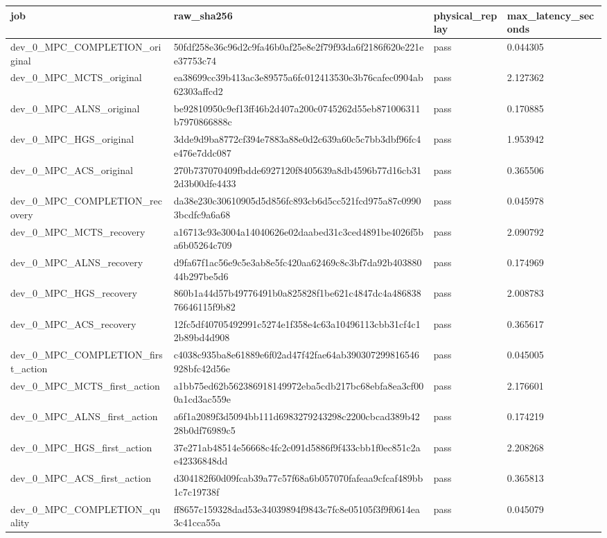 \begin{tabular}{llll}
\hline
job & raw\_sha256 & physical\_replay & max\_latency\_seconds \\
\hline
dev\_0\_MPC\_COMPLETION\_original & 50fdf258e36c96d2c9fa46b0af25e8e2f79f93da6f2186f620e221ee37753c74 & pass & 0.044305 \\
dev\_0\_MPC\_MCTS\_original & ea38699cc39b413ac3e89575a6fc012413530e3b76cafec0904ab62303affcd2 & pass & 2.127362 \\
dev\_0\_MPC\_ALNS\_original & be92810950c9ef13ff46b2d407a200c0745262d55eb871006311b7970866888c & pass & 0.170885 \\
dev\_0\_MPC\_HGS\_original & 3dde9d9ba8772cf394e7883a88e0d2c639a60c5c7bb3dbf96fc4e476e7ddc087 & pass & 1.953942 \\
dev\_0\_MPC\_ACS\_original & 270b737070409fbdde6927120f8405639a8db4596b77d16cb312d3b00dfe4433 & pass & 0.365506 \\
dev\_0\_MPC\_COMPLETION\_recovery & da38e230c30610905d5d856fc893cb6d5cc521fcd975a87c09903bcdfc9a6a68 & pass & 0.045978 \\
dev\_0\_MPC\_MCTS\_recovery & a16713c93e3004a14040626e02daabed31c3ced4891be4026f5ba6b05264c709 & pass & 2.090792 \\
dev\_0\_MPC\_ALNS\_recovery & d9fa67f1ac56e9c5e3ab8e5fc420aa62469c8c3bf7da92b40388044b297be5d6 & pass & 0.174969 \\
dev\_0\_MPC\_HGS\_recovery & 860b1a44d57b49776491b0a825828f1be621c4847dc4a48683876646115f9b82 & pass & 2.008783 \\
dev\_0\_MPC\_ACS\_recovery & 12fc5df40705492991c5274e1f358e4c63a10496113cbb31cf4c12b89bd4d908 & pass & 0.365617 \\
dev\_0\_MPC\_COMPLETION\_first\_action & c4038c935ba8e61889e6f02ad47f42fae64ab390307299816546928bfc42d56e & pass & 0.045005 \\
dev\_0\_MPC\_MCTS\_first\_action & a1bb75ed62b562386918149972eba5cdb217bc68ebfa8ea3cf000a1cd3ac559e & pass & 2.176601 \\
dev\_0\_MPC\_ALNS\_first\_action & a6f1a2089f3d5094bb111d6983279243298c2200cbcad389b4228b0df76989c5 & pass & 0.174219 \\
dev\_0\_MPC\_HGS\_first\_action & 37e271ab48514e56668c4fc2c091d5886f9f433cbb1f0ec851c2ae42336848dd & pass & 2.208268 \\
dev\_0\_MPC\_ACS\_first\_action & d304182f60d09fcab39a77c57f68a6b057070fafeaa9cfcaf489bb1c7c19738f & pass & 0.365813 \\
dev\_0\_MPC\_COMPLETION\_quality & ff8657c159328dad53e34039894f9843c7fc8e05105f3f9f0614ea3c41cca55a & pass & 0.045079 \\

\end{tabular}
